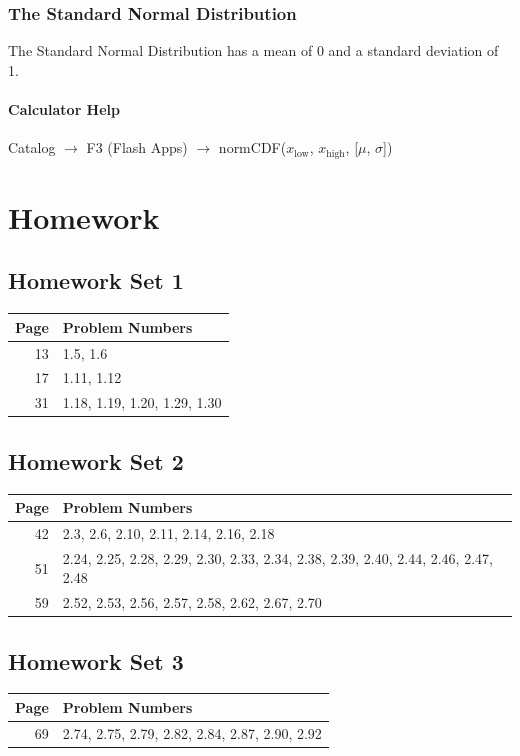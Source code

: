 \documentclass{book}
\begin{document}
\subsection{The Standard Normal Distribution}
The Standard Normal Distribution has a mean of 0 and a standard deviation of 1.

\subsubsection{Calculator Help}
Catalog $\rightarrow$ F3 (Flash Apps) $\rightarrow$ normCDF($x_\text{low}$, $x_\text{high}$, [$\mu$, $\sigma$])


\appendix
\chapter{Homework}
\section{Homework Set 1}
\begin{tabular}{r|l}
Page & Problem Numbers\\
\hline
13 & 1.5, 1.6\\
17 & 1.11, 1.12\\
31 & 1.18, 1.19, 1.20, 1.29, 1.30\\
\end{tabular}

\section{Homework Set 2}
\begin{tabular}{r|l}
Page & Problem Numbers\\
\hline
42 & 2.3, 2.6, 2.10, 2.11, 2.14, 2.16, 2.18\\
51 & 2.24, 2.25, 2.28, 2.29, 2.30, 2.33, 2.34, 2.38, 2.39, 2.40, 2.44, 2.46, 2.47, 2.48\\
59 & 2.52, 2.53, 2.56, 2.57, 2.58, 2.62, 2.67, 2.70\\
\end{tabular}

\section{Homework Set 3}
\begin{tabular}{r|l}
Page & Problem Numbers\\
\hline
69 & 2.74, 2.75, 2.79, 2.82, 2.84, 2.87, 2.90, 2.92\\
\end{tabular}
\end{document}
